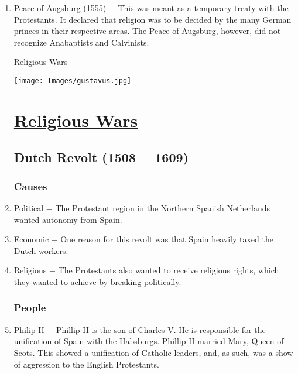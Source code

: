 \documentclass[12pt]{article}
\begin{document}
\begin{enumerate}
\item Peace of Augsburg (1555) $-$ This was meant as a temporary treaty with the Protestants. It declared that religion was to be decided by the many German princes in their respective areas. The Peace of Augsburg, however, did not recognize Anabaptists and Calvinists.

\newpage
\begin{center}
\end{center}
\begin{center}
\end{center}
\begin{center}
\underline{\Huge Religious Wars}
\end{center}
\vspace{50pt}
\texttt{[image: Images/gustavus.jpg]}
\newpage


\section{\underline{Religious Wars}}

\subsection{Dutch Revolt (1508 $-$ 1609)}

\subsubsection{Causes}

\item Political $-$ The Protestant region in the Northern Spanish Netherlands wanted autonomy from Spain.

\item Economic $-$ One reason for this revolt was that Spain heavily taxed the Dutch workers.

\item Religious $-$ The Protestants also wanted to receive religious rights, which they wanted to achieve by breaking politically.

\subsubsection{People}

\item Philip II $-$ Phillip II is the son of Charles V. He is responsible for the unification of Spain with the Habsburgs. Phillip II married Mary, Queen of Scots. This showed a unification of Catholic leaders, and, as such, was a show of aggression to the English Protestants.


\end{enumerate}
\end{document}
